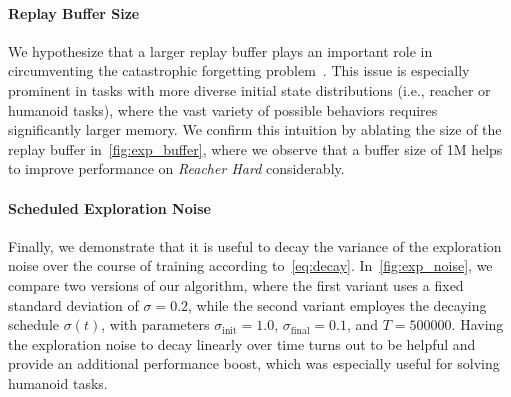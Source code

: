 \paragraph{Replay Buffer Size}
We hypothesize that a larger replay buffer plays an important role in circumventing the catastrophic forgetting problem~\citep{fedus2020replay}. This issue is especially prominent in tasks with more diverse initial state distributions (i.e., reacher or humanoid tasks), where the vast variety of possible behaviors requires significantly larger memory. We confirm this intuition by ablating the size of the replay buffer in~\cref{fig:exp_buffer}, where we observe that a buffer size of 1M helps to improve performance on \textit{Reacher Hard} considerably. 


\paragraph{Scheduled Exploration Noise}
Finally, we demonstrate that it is useful to decay the variance of the exploration noise over the course of training according to~\cref{eq:decay}. In~\cref{fig:exp_noise}, we compare two versions of our algorithm, where the first variant uses a fixed standard deviation of $\sigma=0.2$, while the second variant employes the decaying schedule $\sigma(t)$, with parameters $\sigma_{\mathrm{init}}=1.0$, $\sigma_{\mathrm{final}}=0.1$, and $T=500000$. Having the exploration noise to decay linearly over time turns out to be helpful and provide an additional performance boost, which was especially useful for solving humanoid tasks.






